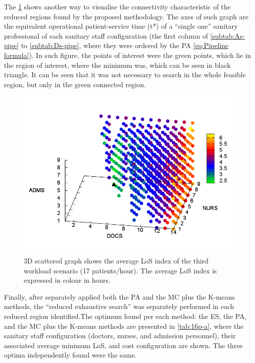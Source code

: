 The \ref{fig:3D-scattered-graph-100} shows another way to visualise
the connectivity characteristic of the reduced regions found by the
proposed methodology. The axes of such graph are the equivalent operational
patient-service time \foreignlanguage{american}{(t{*})} of a ``single
one'' sanitary professional of each sanitary staff configuration
(the first column of \ref{subtab:As-pipe} to \ref{subtab:Ds-pipe},
where they were ordered by the PA \ref{eq:Pipeline formula}). In
such figure, the points of interest were the green points, which lie
in the region of interest, where the minimum was, which can be seen
in black triangle. It can be seen that it was not necessary to search
in the whole feasible region, but only in the green connected region.
\begin{figure}[h]
\noindent \centering{}\includegraphics[width=0.88\columnwidth,height=0.2\paperheight]{figs4/v0/6400-602-100-3D-scatter-LoS2}\caption{3D scattered graph shows the average LoS index of the third workload
scenario (17 patients/hour). The average LoS index is expressed in
colour in hours. \label{fig:3D-scattered-graph-100}}
\end{figure}


Finally, after separately applied both the PA and the MC plus the
K-means methods, the \textquotedblleft{}reduced exhaustive search\textquotedblright{}
was separately performed in each reduced region identified.The optimum
found per each method: the ES, the PA, and the MC plus the K-means
methods are presented in \ref{tab:16p-a}, where the sanitary staff
configuration (doctors, nurses, and admission personnel), their associated
average minimum LoS, and cost configuration are shown. The three optima
independently found were the same. 

